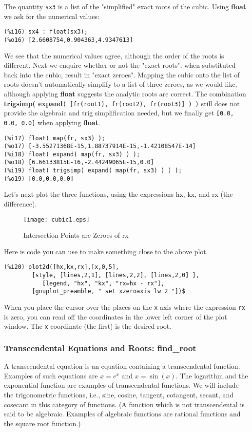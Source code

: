 \documentclass[12pt]{article}
\begin{document}
\normalsize
The quantity \verb|sx3| is a list of the "simplified" exact roots of
  the cubic.
Using \textbf{float} we ask for the numerical values:
\small
\begin{verbatim}
(%i16) sx4 : float(sx3);
(%o16) [2.6608754,0.904363,4.9347613]
\end{verbatim}
\normalsize
We see that the numerical values agree, although the order of
  the roots is different.
Next we enquire whether or not the "exact roots", when substituted back into the cubic,
  result in "exact zeroes".
Mapping the cubic onto the list of roots doesn't automatically simplify to
  a list of three zeroes, as we would like, although applying \textbf{float}
  suggests the analytic roots are correct.
The combination\\
 \textbf{trigsimp( expand}\verb|( [fr(root1), fr(root2), fr(root3)] ) )|
  still does not provide the algebraic and trig simplification needed, but we
  finally get \verb|[0.0, 0.0, 0.0]| when applying \textbf{float}.
\small
\begin{verbatim}
(%i17) float( map(fr, sx3) );
(%o17) [-3.55271368E-15,1.88737914E-15,-1.42108547E-14]
(%i18) float( expand( map(fr, sx3) ) );
(%o18) [6.66133815E-16,-2.44249065E-15,0.0]
(%i19) float( trigsimp( expand( map(fr, sx3) ) ) );
(%o19) [0.0,0.0,0.0]
\end{verbatim}
\normalsize
Let's next plot the three functions, using the expressions hx, kx, and rx (the difference).

\smallskip
\begin{figure} [ht]
   \centerline{\texttt{[image: cubic1.eps]} }
	\caption{Intersection Points are Zeroes of rx}
\end{figure}


Here is code you can use to make something close to the above plot.
\small
\begin{verbatim}
(%i20) plot2d([hx,kx,rx],[x,0,5],
        [style, [lines,2,1], [lines,2,2], [lines,2,0] ],
           [legend, "hx", "kx", "rx=hx - rx"],
        [gnuplot_preamble, " set xzeroaxis lw 2 "])$
\end{verbatim}
\normalsize
When you place the cursor over the places on the \verb|x| axis where the expression
  \verb|rx| is zero, you can read off the coordinates in the lower left corner of the plot
  window.
The \verb|x| coordinate (the first) is the desired root.  
 \newpage

 
 \subsubsection{Transcendental Equations and Roots: \; find\_root}
A transcendental equation is an equation containing a transcendental function.
Examples of such equations are $x=e^{x}$ and $x = \sin(x)$.
The logarithm and the exponential function are examples of transcendental functions.
We will include the trigonometric functions, i.e., sine, cosine, tangent,
  cotangent, secant, and cosecant in this category of functions.
(A function which is not transcendental is said to be algebraic.
Examples of algebraic functions are rational functions and the square root function.)
\end{document}
